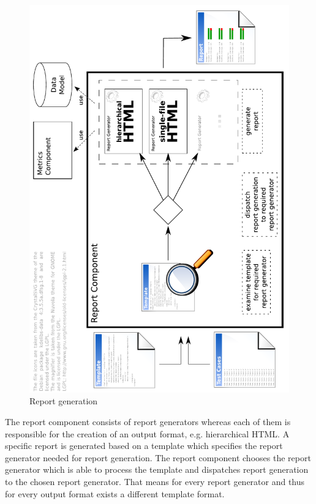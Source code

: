 \begin{figure}[hbtp]
 \centering
 \includegraphics[width=\textwidth]{images/Report/report_process.pdf}
 \caption{Report generation}
 \label{figure:Components:Report:process}
\end{figure}

The report component consists of report generators whereas each of them is responsible for the creation of an output format, e.g. hierarchical HTML. A specific report is generated based on a template which specifies the report generator needed for report generation. The report component chooses the report generator which is able to process the template and dispatches report generation to the chosen report generator. That means for every report generator and thus for every output format exists a different template format.

